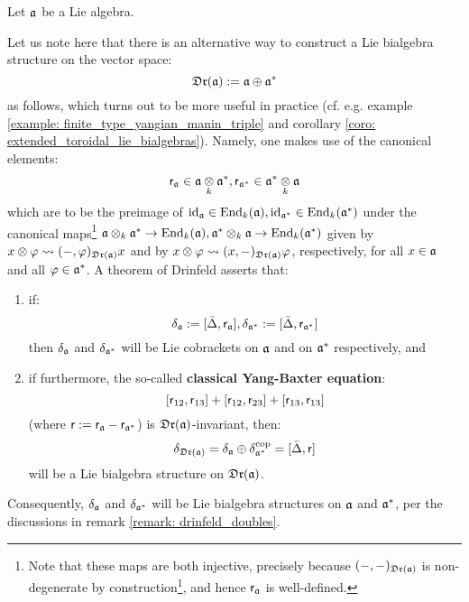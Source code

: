         \begin{remark} \label{remark: classical_R_matrices}
            Let $\a$ be a Lie algebra.
        
            Let us note here that there is an alternative way to construct a Lie bialgebra structure on the vector space:
                $$\mathfrak{Dr}(\mathfrak{a}) := \mathfrak{a} \oplus \mathfrak{a}^*$$
            as follows, which turns out to be more useful in practice (cf. e.g. example \ref{example: finite_type_yangian_manin_triple} and corollary \ref{coro: extended_toroidal_lie_bialgebras}). Namely, one makes use of the canonical elements:
                $$\sfr_{\a} \in \a \tensor_k \a^*, \sfr_{\a^*} \in \a^* \tensor_k \a$$
            which are to be the preimage of $\mathrm{id}_{\mathfrak{a}} \in \mathrm{End}_k(\mathfrak{a}), \mathrm{id}_{\mathfrak{a}^*} \in \mathrm{End}_k(\mathfrak{a}^*)$ under the canonical maps\footnote{Note that these maps are both injective, precisely because $(-, -)_{\mathfrak{Dr}(\mathfrak{a})}$ is non-degenerate by construction\footnote{Note that we are not making use of invariance here, and hence we do not need to assume that $\a$ is a Lie bialgebra from the start (this assumption is needed for the construction of the Lie bracket on $\frakDr(\a)$).}, and hence $\mathsf{r}_{\mathfrak{a}}$ is well-defined.} $\a \tensor_k \a^* \to \End_k(\a), \a^* \tensor_k \a \to \End_k(\a^*)$ given by $x \tensor \varphi \mapsto (-, \varphi)_{\frakDr(\a)} x$ and by $x \tensor \varphi \mapsto (x, -)_{\frakDr(\a)} \varphi$, respectively, for all $x \in \mathfrak{a}$ and all $\varphi \in \mathfrak{a}^*$. A theorem of Drinfeld asserts that:
            \begin{enumerate}
                \item if:
                    $$\delta_{\mathfrak{a}} := [\bar{\Delta}, \mathsf{r}_{\mathfrak{a}}], \delta_{\mathfrak{a}^*} := [\bar{\Delta}, \mathsf{r}_{\mathfrak{a}^*}]$$
                then $\delta_{\mathfrak{a}}$ and $\delta_{\mathfrak{a}^*}$ will be Lie cobrackets on $\a$ and on $\mathfrak{a}^*$ respectively, and
                \item if furthermore, the so-called \textbf{classical Yang-Baxter equation}:
                    $$[\mathsf{r}_{12}, \mathsf{r}_{13}] + [\mathsf{r}_{12}, \mathsf{r}_{23}] + [\mathsf{r}_{13}, \mathsf{r}_{13}]$$
                (where $\mathsf{r} := \mathsf{r}_{\mathfrak{a}} - \mathsf{r}_{\mathfrak{a}^*}$) is $\frakDr(\a)$-invariant, then:
                    $$\delta_{\mathfrak{Dr}(\mathfrak{a})} = \delta_{\mathfrak{a}} \oplus \delta_{\mathfrak{a}^*}^{\mathrm{cop}} = [\bar{\Delta}, \mathsf{r}]$$
                will be a Lie bialgebra structure on $\frakDr(\a)$.
            \end{enumerate}
            Consequently, $\delta_{\mathfrak{a}}$ and $\delta_{\mathfrak{a}^*}$ will be Lie bialgebra structures on $\a$ and $\mathfrak{a}^*$, per the discussions in remark \ref{remark: drinfeld_doubles}.
        \end{remark}
